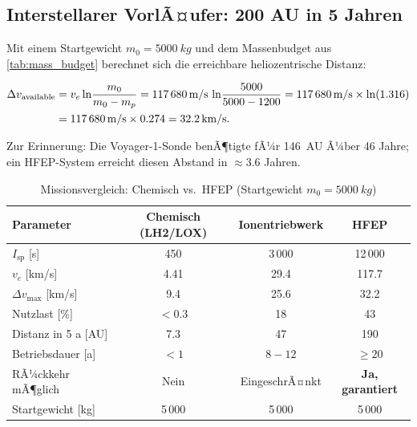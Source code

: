 ﻿\documentclass[a4paper,12pt,twoside]{article}
\theoremstyle{plain}
\theoremstyle{definition}
\theoremstyle{remark}
\newcommand{\Isp}{I_{\mathrm{sp}}}
\newcommand{\ve}{v_e}
\newcommand{\Dv}{\Delta v}
\begin{document}
	\subsection{Interstellarer VorlÃ¤ufer: 200 AU in 5 Jahren}
	
	Mit einem Startgewicht $m_0 = \SI{5000}{kg}$ und dem Massenbudget aus
	\cref{tab:mass_budget} berechnet sich die erreichbare heliozentrische Distanz:
	
	\begin{align}
		\Dv_{\rm available} &= \ve\ln\!\frac{m_0}{m_0 - m_p}
		= \SI{117680}{m/s}\,\ln\!\frac{5000}{5000-1200}
		= \SI{117680}{m/s}\times\ln(1.316) \nonumber\\
		&= \SI{117680}{m/s}\times 0.274 = \SI{32.2}{km/s}.
	\end{align}
	
	Zur Erinnerung: Die Voyager-1-Sonde \cite{kohlhase1977, stone2013} benÃ¶tigte fÃ¼r \SI{146}{AU} Ã¼ber 46 Jahre;
	ein HFEP-System erreicht diesen Abstand in $\approx 3.6$ Jahren.
	
	\begin{table}[H]
		\centering
		\caption{Missionsvergleich: Chemisch vs.\ HFEP (Startgewicht $m_0 = \SI{5000}{kg}$)}
		\label{tab:mission_compare}
		\renewcommand{\arraystretch}{1.35}
		\begin{tabular}{lccc}
			\toprule
			\textbf{Parameter} & \textbf{Chemisch (LH2/LOX)} & \textbf{Ionentriebwerk} & \textbf{HFEP}\\
			\midrule
			$\Isp$ [s]           & 450          & 3\,000        & 12\,000\\
			$\ve$ [km/s]         & 4.41         & 29.4          & 117.7\\
			$\Dv_{\max}$ [km/s]  & 9.4          & 25.6          & 32.2\\
			Nutzlast [\%]        & $<0.3$        & 18            & 43\\
			Distanz in 5 a [AU]  & 7.3          & 47            & 190\\
			Betriebsdauer [a]    & $<1$         & $8-12$        & $\geq 20$\\
			RÃ¼ckkehr mÃ¶glich     & Nein         & EingeschrÃ¤nkt & \textbf{Ja, garantiert}\\
			Startgewicht [kg]    & 5\,000       & 5\,000        & 5\,000\\
			\bottomrule
		\end{tabular}
	\end{table}
	
\end{document}
